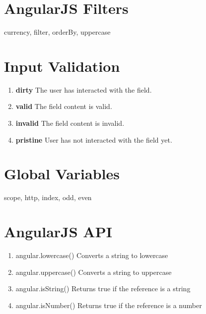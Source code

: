 \section{AngularJS Filters}

currency, filter, orderBy, uppercase

\section{Input Validation}

\begin{enumerate}
    \item  \textbf{\textdollar dirty}	The user has interacted with the field.
    \item  \textbf{\textdollar valid}	The field content is valid.
    \item  \textbf{\textdollar invalid}	The field content is invalid.
    \item  \textbf{\textdollar pristine}	User has not interacted with the field yet.
\end{enumerate}

\section{Global  Variables } 

scope, http,  index, odd, even 


\section{AngularJS API}

\begin{enumerate}
    \item angular.lowercase()	Converts a string to lowercase
    \item angular.uppercase()	Converts a string to uppercase
    \item angular.isString()	Returns true if the reference is a string
    \item angular.isNumber()	Returns true if the reference is a number
\end{enumerate}